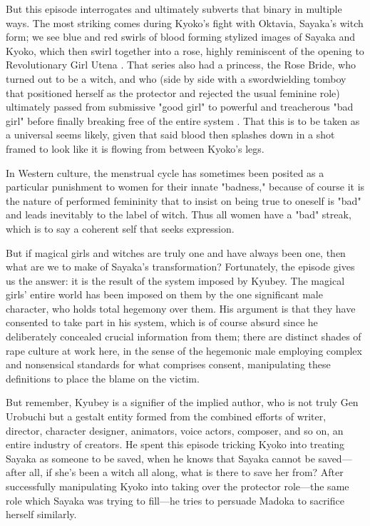 But this episode interrogates and ultimately subverts that binary in multiple ways. The most striking comes during Kyoko's fight with Oktavia, Sayaka's witch form; we see blue and red swirls of blood forming stylized images of Sayaka and Kyoko, which then swirl together into a rose, highly reminiscent of the opening to Revolutionary Girl Utena \cite{ref68}. That series also had a princess, the Rose Bride, who turned out to be a witch, and who (side by side with a swordwielding tomboy that positioned herself as the protector and rejected the usual feminine role) ultimately passed from submissive "good girl" to powerful and treacherous "bad girl" before finally breaking free of the entire system \cite{ref69}. That this is to be taken as a universal seems likely, given that said blood then splashes down in a shot framed to look like it is flowing from between Kyoko's legs.

In Western culture, the menstrual cycle has sometimes been posited as a particular punishment to women for their innate "badness," \cite{ref70} because of course it is the nature of performed femininity that to insist on being true to oneself is "bad" and leads inevitably to the label of witch. Thus all women have a "bad" streak, which is to say a coherent self that seeks expression.

But if magical girls and witches are truly one and have always been one, then what are we to make of Sayaka's transformation? Fortunately, the episode gives us the answer: it is the result of the system imposed by Kyubey. The magical girls' entire world has been imposed on them by the one significant male character, who holds total hegemony over them. His argument is that they have consented to take part in his system, which is of course absurd since he deliberately concealed crucial information from them; there are distinct shades of rape culture at work here, in the sense of the hegemonic male employing complex and nonsensical standards for what comprises consent, manipulating these definitions to place the blame on the victim.

But remember, Kyubey is a signifier of the implied author, who is not truly Gen Urobuchi but a gestalt entity formed from the combined efforts of writer, director, character designer, animators, voice actors, composer, and so on, an entire industry of creators. He spent this episode tricking Kyoko into treating Sayaka as someone to be saved, when he knows that Sayaka cannot be saved—after all, if she's been a witch all along, what is there to save her from? After successfully manipulating Kyoko into taking over the protector role—the same role which Sayaka was trying to fill—he tries to persuade Madoka to sacrifice herself similarly.

